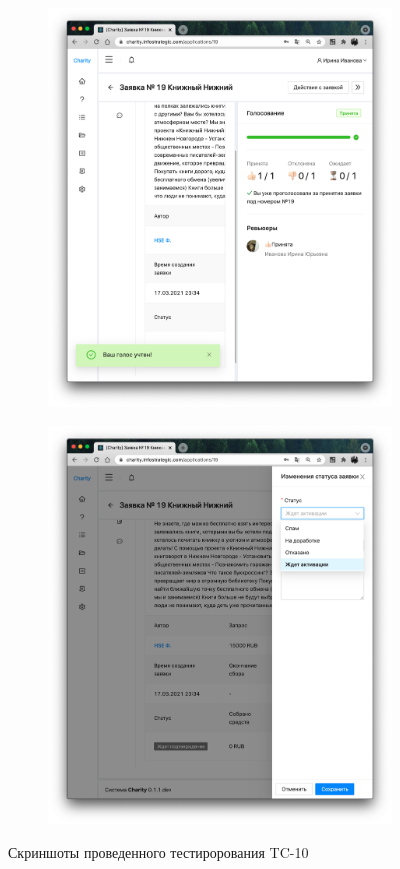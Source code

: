 \documentclass[a4paper,12pt,reqno]{article}
\begin{document}
\begin{figure}[H]
\begin{subfigure}[b]{0.475\linewidth}
			\includegraphics[width=\linewidth]{img/test/6.png}
		\end{subfigure}
		\begin{subfigure}[b]{0.475\linewidth}
			\includegraphics[width=\linewidth]{img/test/7.png}
		\end{subfigure}
		\caption{Скриншоты проведенного тестирорования TC-10}
	\end{figure}
	
\end{document}
